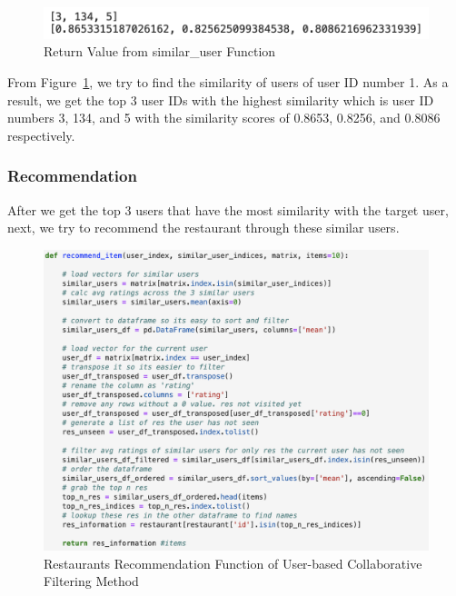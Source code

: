 \documentclass[12pt,oneside,openright,a4paper]{cpe-english-project}
\begin{document}
\begin{figure}[H]\centering
\includegraphics[width=350pt]{./images/4ReturnValuefromsimilar_uesrFunction.png}
\caption{Return Value from similar\_user Function}\label{fig:4ReturnValuefromsimilaruesrFunction}
\end{figure}\vspace{-24pt}

From Figure~\ref{fig:4ReturnValuefromsimilaruesrFunction}, we try to find the similarity of users of user ID number 1. As a result, we get the top 3 user IDs with the highest similarity which is user ID numbers 3, 134, and 5 with the similarity scores of 0.8653, 0.8256, and 0.8086 respectively.

\subsubsection{Recommendation}

After we get the top 3 users that have the most similarity with the target user, next, we try to recommend the restaurant through these similar users.

\begin{figure}[H]\centering
\includegraphics[width=350pt]{./images/4RestaurantsRecommendationFunctionofUserbasedCollaborativeFilteringMethod.png}
\caption{Restaurants Recommendation Function of User-based Collaborative Filtering Method}\label{fig:4RestaurantsRecommendationFunctionofUserbasedCollaborativeFilteringMethod}
\end{figure}\vspace{-24pt}
\end{document}
